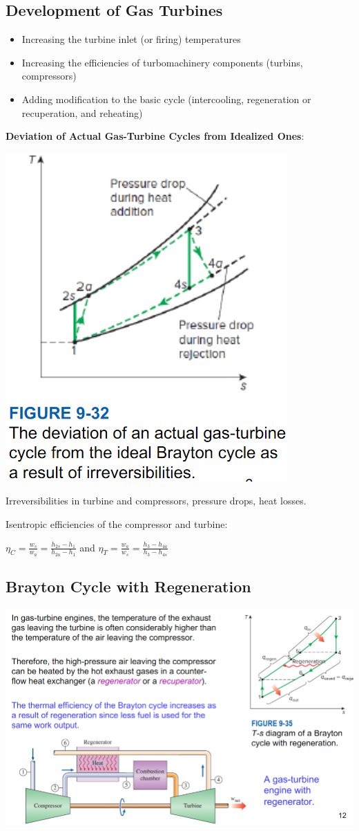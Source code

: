 \documentclass{article}
\begin{document}
\begin{multicols}{3}
    \subsection*{Development of Gas Turbines}
    \begin{itemize}
        \item Increasing the turbine inlet (or firing) temperatures
        \item Increasing the efficiencies of turbomachinery components (turbins, compressors)
        \item Adding modification to the basic cycle (intercooling, regeneration or recuperation, and reheating)
    \end{itemize}
    \textbf{Deviation of Actual Gas-Turbine Cycles from Idealized Ones}:\par
    \includegraphics[width=0.5\linewidth]{Images/non_ideal_cycles.png}\par 
    Irreversibilities in turbine and compressors, pressure drops, heat losses.\par 
    Isentropic efficiencies of the compressor and turbine:\par 
    $\eta_C=\frac{w_s}{w_a}=\frac{h_{2s}-h_1}{h_{2a}-h_1}$ and $\eta_T=\frac{w_a}{w_s}=\frac{h_3-h_{4a}}{h_3-h_{4s}}$\par 
    \subsection*{Brayton Cycle with Regeneration}
    \includegraphics[width=\linewidth]{Images/Brayton_regen.png}


\end{multicols}
\end{document}

